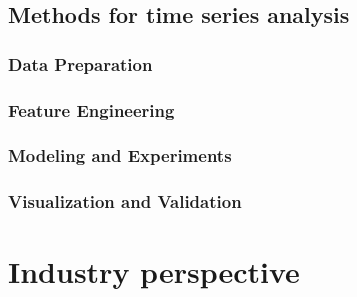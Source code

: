 \documentclass[aspectratio=169,xcolor=x11names,table]{beamer}
\begin{document}

\subsection{Methods for time series analysis}

\begin{frame}
	\frametitle{Data Preparation}
	
\end{frame}

\begin{frame}
	\frametitle{Feature Engineering}
	
\end{frame}

\begin{frame}
	\frametitle{Modeling and Experiments}
	
\end{frame}

\begin{frame}
	\frametitle{Visualization and Validation}
	
\end{frame}

\section{Industry perspective}
\end{document}
